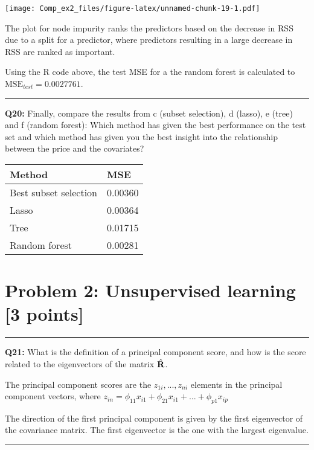 \documentclass[]{article}
\begin{document}
\texttt{[image: Comp\_ex2\_files/figure-latex/unnamed-chunk-19-1.pdf]}

The plot for node impurity ranks the predictors based on the decrease in
RSS due to a split for a predictor, where predictors resulting in a
large decrease in RSS are ranked as important.

Using the R code above, the test MSE for a the random forest is
calculated to \(\text{MSE}_{test} = 0.0027761\).

\begin{center}\rule{0.5\linewidth}{\linethickness}\end{center}

\textbf{Q20:} Finally, compare the results from c (subset selection), d
(lasso), e (tree) and f (random forest): Which method has given the best
performance on the test set and which method has given you the best
insight into the relationship between the price and the covariates?

\begin{longtable}[]{@{}ll@{}}
\toprule
Method & MSE\tabularnewline
\midrule
\endhead
Best subset selection & 0.00360\tabularnewline
Lasso & 0.00364\tabularnewline
Tree & 0.01715\tabularnewline
Random forest & 0.00281\tabularnewline
\bottomrule
\end{longtable}

\section{Problem 2: Unsupervised learning {[}3
points{]}}\label{problem-2-unsupervised-learning-3-points}

\begin{center}\rule{0.5\linewidth}{\linethickness}\end{center}

\textbf{Q21:} What is the definition of a principal component score, and
how is the score related to the eigenvectors of the matrix
\({\hat {\bf R}}\).

The principal component scores are the \(z_{1i}, ..., z_{ni}\) elements
in the principal component vectors, where
\(z_{in} = \phi_{11}x_{i1}+\phi_{21}x_{i1}+...+\phi_{p1}x_{ip}\)

The direction of the first principal component is given by the first
eigenvector of the covariance matrix. The first eigenvector is the one
with the largest eigenvalue.

\begin{center}\rule{0.5\linewidth}{\linethickness}\end{center}
\end{document}
